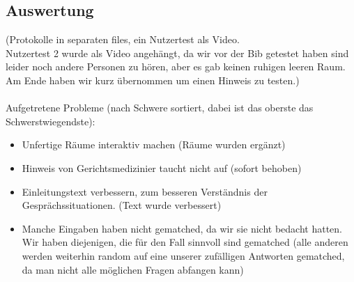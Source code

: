 \documentclass[10pt,a4paper]{article}
\begin{document}
\subsection*{Auswertung}
(Protokolle in separaten files, ein Nutzertest als Video.\\
Nutzertest 2 wurde als Video angehängt, da wir vor der Bib getestet haben sind leider noch andere Personen zu hören, aber es gab keinen ruhigen leeren Raum. Am Ende haben wir kurz übernommen um einen Hinweis zu testen.)\\
\\
Aufgetretene Probleme (nach Schwere sortiert, dabei ist das oberste das Schwerstwiegendste):
\begin{itemize}
\item Unfertige Räume interaktiv machen (Räume wurden ergänzt)
\item Hinweis von Gerichtsmedizinier taucht nicht auf (sofort behoben)
\item Einleitungstext verbessern, zum besseren Verständnis der Gesprächssituationen. (Text wurde verbessert)
\item Manche Eingaben haben nicht gematched, da wir sie nicht bedacht hatten. Wir haben diejenigen, die für den Fall sinnvoll sind gematched (alle anderen werden weiterhin random auf eine unserer zufälligen Antworten gematched, da man nicht alle möglichen Fragen abfangen kann)
\end{itemize}




\newpage
\end{document}
